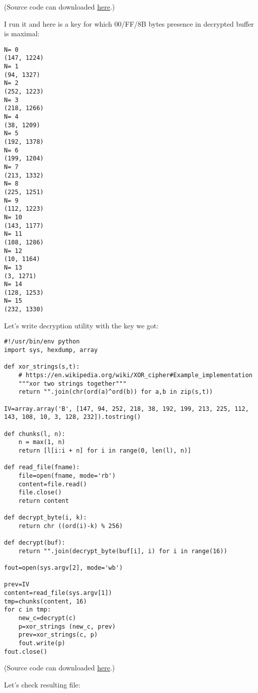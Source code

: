 (Source code can downloaded \href{https://github.com/dennis714/RE-for-beginners/blob/master/examples/simple_exec_crypto/files/decrypt.py}{here}.)

I run it and here is a key for which 00/FF/8B bytes presence in decrypted buffer is maximal:

\begin{lstlisting}
N= 0
(147, 1224)
N= 1
(94, 1327)
N= 2
(252, 1223)
N= 3
(218, 1266)
N= 4
(38, 1209)
N= 5
(192, 1378)
N= 6
(199, 1204)
N= 7
(213, 1332)
N= 8
(225, 1251)
N= 9
(112, 1223)
N= 10
(143, 1177)
N= 11
(108, 1286)
N= 12
(10, 1164)
N= 13
(3, 1271)
N= 14
(128, 1253)
N= 15
(232, 1330)
\end{lstlisting}

Let's write decryption utility with the key we got:

\begin{lstlisting}[style=custompy]
#!/usr/bin/env python
import sys, hexdump, array

def xor_strings(s,t):
    # https://en.wikipedia.org/wiki/XOR_cipher#Example_implementation
    """xor two strings together"""
    return "".join(chr(ord(a)^ord(b)) for a,b in zip(s,t))

IV=array.array('B', [147, 94, 252, 218, 38, 192, 199, 213, 225, 112, 143, 108, 10, 3, 128, 232]).tostring()

def chunks(l, n):
    n = max(1, n)
    return [l[i:i + n] for i in range(0, len(l), n)]

def read_file(fname):
    file=open(fname, mode='rb')
    content=file.read()
    file.close()
    return content

def decrypt_byte(i, k):
    return chr ((ord(i)-k) % 256)

def decrypt(buf):
    return "".join(decrypt_byte(buf[i], i) for i in range(16))

fout=open(sys.argv[2], mode='wb')

prev=IV
content=read_file(sys.argv[1])
tmp=chunks(content, 16)
for c in tmp:
    new_c=decrypt(c)
    p=xor_strings (new_c, prev)
    prev=xor_strings(c, p)
    fout.write(p)
fout.close()
\end{lstlisting}

(Source code can downloaded \href{https://github.com/dennis714/RE-for-beginners/blob/master/examples/simple_exec_crypto/files/decrypt2.py}{here}.)

Let's check resulting file:



